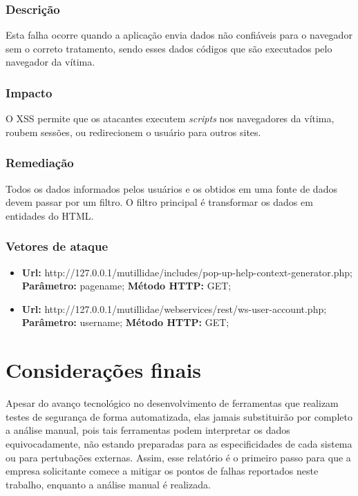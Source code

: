 \documentclass{ufscThesis}
\newcommand{\+}{\discretionary{\mbox{${\bm\cdot}\mkern-1mu$}}{}{}}
\renewcommand\+{\discretionary{}{}{}}
\begin{document}
\subsection{Descrição}

Esta falha ocorre quando a aplicação envia dados não confiáveis para o navegador sem o correto tratamento, sendo esses dados códigos que são executados pelo navegador da vítima.

\subsection{Impacto}
O XSS permite que os atacantes executem \emph{scripts} nos navegadores da vítima, roubem sessões, ou redirecionem o usuário para outros sites.

\subsection{Remediação}

Todos os dados informados pelos usuários e os obtidos em uma fonte de dados devem passar por um filtro. O filtro principal é transformar os dados em entidades do HTML.

\subsection{Vetores de ataque}

\begin{itemize}
\item \textbf{Url:} http://127.0.0.1/mutillidae/includes/pop-up-help-context-generator.php; \textbf{Parâmetro:} pagename; \textbf{Método HTTP:} GET;
\item \textbf{Url:} http://127.0.0.1/mutillidae/webservices/rest/ws-user-account.php; \textbf{Parâmetro:} username; \textbf{Método HTTP:} GET;
\end{itemize}


\chapter{Considerações finais}
Apesar do avanço tecnológico no desenvolvimento de ferramentas que realizam testes de segurança de forma automatizada, elas jamais substituirão por completo a análise manual, pois tais ferramentas podem interpretar os dados equivocadamente, não estando preparadas para as especificidades de cada sistema ou para pertubações externas. Assim, esse relatório é o primeiro passo para que a empresa solicitante comece a mitigar os pontos de falhas reportados neste trabalho, enquanto a análise manual é realizada.
\end{document}
